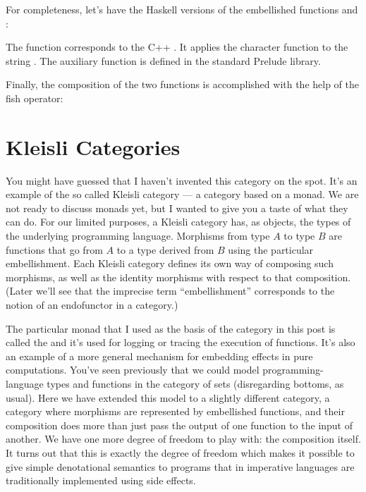 For completeness, let's have the Haskell versions of the embellished
functions  and :

The function  corresponds to the C++ . It
applies the character function  to the string
. The auxiliary function  is defined in the
standard Prelude library.

Finally, the composition of the two functions is accomplished with the
help of the fish operator:


\section{Kleisli Categories}

You might have guessed that I haven't invented this category on the
spot. It's an example of the so called Kleisli category --- a category
based on a monad. We are not ready to discuss monads yet, but I wanted
to give you a taste of what they can do. For our limited purposes, a
Kleisli category has, as objects, the types of the underlying
programming language. Morphisms from type $A$ to type $B$ are functions that
go from $A$ to a type derived from $B$ using the particular embellishment.
Each Kleisli category defines its own way of composing such morphisms,
as well as the identity morphisms with respect to that composition.
(Later we'll see that the imprecise term ``embellishment'' corresponds
to the notion of an endofunctor in a category.)

The particular monad that I used as the basis of the category in this
post is called the  and it's used for logging or
tracing the execution of functions. It's also an example of a more
general mechanism for embedding effects in pure computations. You've
seen previously that we could model programming-language types and
functions in the category of sets (disregarding bottoms, as usual). Here
we have extended this model to a slightly different category, a category
where morphisms are represented by embellished functions, and their
composition does more than just pass the output of one function to the
input of another. We have one more degree of freedom to play with: the
composition itself. It turns out that this is exactly the degree of
freedom which makes it possible to give simple denotational semantics to
programs that in imperative languages are traditionally implemented
using side effects.

